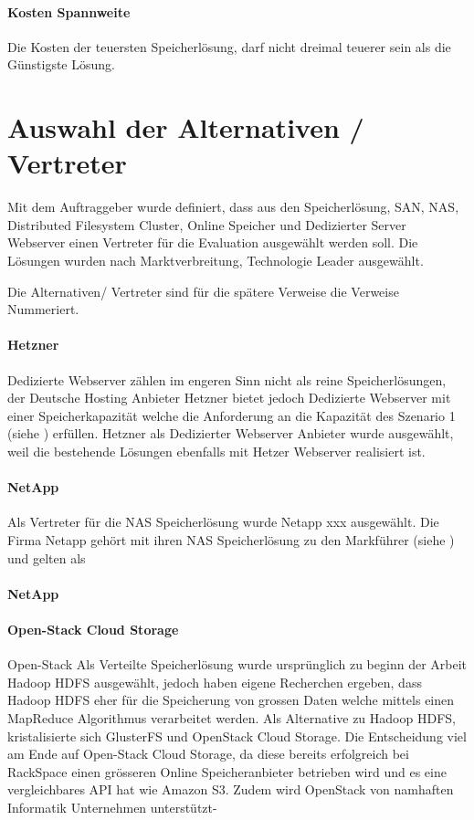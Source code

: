 \paragraph{Kosten Spannweite}\label{KO-3}
Die Kosten der teuersten Speicherlösung, darf nicht dreimal teuerer sein als die Günstigste Lösung.

\section{Auswahl der Alternativen / Vertreter}
Mit dem Auftraggeber wurde definiert, dass aus den Speicherlösung, SAN, NAS, Distributed Filesystem Cluster, Online Speicher und   Dedizierter Server Webserver einen Vertreter für die Evaluation ausgewählt werden soll. Die Lösungen wurden nach Marktverbreitung, Technologie Leader ausgewählt.

Die Alternativen/ Vertreter sind für die spätere Verweise die Verweise Nummeriert.

\setcounter{paragraph}{0}
\renewcommand\theparagraph{Al-\arabic{paragraph}}
\paragraph{Hetzner}\label{Al-1}
Dedizierte Webserver zählen im engeren Sinn nicht als reine Speicherlösungen, der Deutsche Hosting Anbieter Hetzner bietet jedoch Dedizierte Webserver mit einer Speicherkapazität welche die Anforderung an die Kapazität des Szenario 1 (siehe ) erfüllen. Hetzner als Dedizierter Webserver Anbieter wurde ausgewählt, weil die bestehende Lösungen ebenfalls mit Hetzer Webserver realisiert ist. 

\paragraph{NetApp}\label{Al-2}
Als Vertreter für die NAS Speicherlösung wurde Netapp xxx ausgewählt. Die Firma Netapp gehört mit ihren NAS Speicherlösung zu den Markführer (siehe ) und gelten als 

\paragraph{NetApp}\label{Al-3}


\paragraph{Open-Stack Cloud Storage}\label{Al-4}
Open-Stack 
Als Verteilte Speicherlösung wurde ursprünglich zu beginn der Arbeit Hadoop HDFS ausgewählt, jedoch haben eigene Recherchen ergeben, dass Hadoop HDFS eher für die Speicherung von grossen Daten welche mittels einen MapReduce Algorithmus verarbeitet werden. Als Alternative zu Hadoop HDFS, kristalisierte sich GlusterFS und OpenStack Cloud Storage. Die Entscheidung viel am Ende auf Open-Stack Cloud Storage, da diese bereits erfolgreich bei RackSpace einen grösseren Online Speicheranbieter betrieben wird und es eine vergleichbares API hat wie Amazon S3. Zudem wird OpenStack von namhaften Informatik Unternehmen unterstützt-


